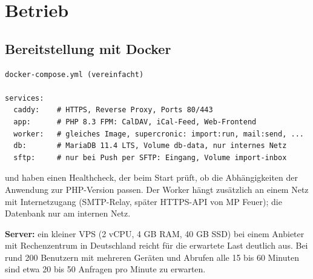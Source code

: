 \section{Betrieb}

\subsection{Bereitstellung mit Docker}

\begin{lstlisting}
docker-compose.yml (vereinfacht)

services:
  caddy:    # HTTPS, Reverse Proxy, Ports 80/443
  app:      # PHP 8.3 FPM: CalDAV, iCal-Feed, Web-Frontend
  worker:   # gleiches Image, supercronic: import:run, mail:send, ...
  db:       # MariaDB 11.4 LTS, Volume db-data, nur internes Netz
  sftp:     # nur bei Push per SFTP: Eingang, Volume import-inbox
\end{lstlisting}

 und  haben einen Healthcheck, der beim Start prüft,
ob die Abhängigkeiten der Anwendung zur PHP-Version passen. Der Worker hängt
zusätzlich an einem Netz mit Internetzugang (SMTP-Relay, später HTTPS-API von
MP Feuer); die Datenbank nur am internen Netz.

\textbf{Server:} ein kleiner VPS (2 vCPU, 4 GB RAM, 40 GB SSD) bei einem
Anbieter mit Rechenzentrum in Deutschland reicht für die erwartete Last
deutlich aus. Bei rund 200 Benutzern mit mehreren Geräten und Abrufen alle
15 bis 60 Minuten sind etwa 20 bis 50 Anfragen pro Minute zu erwarten.

